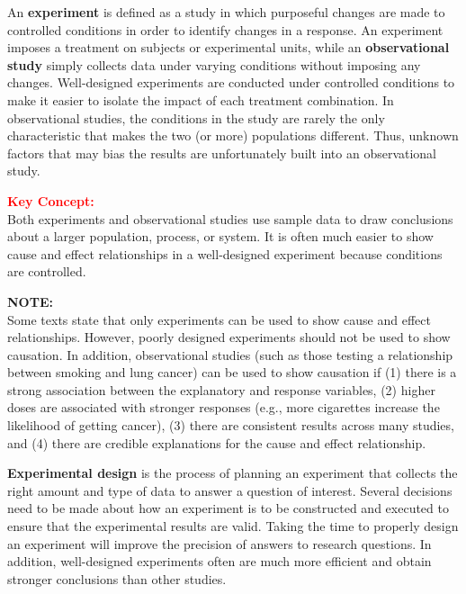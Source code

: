 \documentclass[
]{report}
\begin{document}
An \textbf{experiment} is defined as a study in which purposeful changes are made to controlled conditions in order to identify changes in a response. An experiment imposes a treatment on subjects or experimental units, while an \textbf{observational study} simply collects data under varying conditions without imposing any changes. Well-designed experiments are conducted under controlled conditions to make it easier to isolate the impact of each treatment combination. In observational studies, the conditions in the study are rarely the only characteristic that makes the two (or more) populations different. Thus, unknown factors that may bias the results are unfortunately built into an observational study.

\large

\textbf{\textcolor{red}{Key Concept:}}\\
\color{red}
Both experiments and observational studies use sample data to draw conclusions about a larger population, process, or system. It is often much easier to show cause and effect relationships in a well-designed experiment because conditions are controlled.\\
\color{black}
\normalsize

\large

\textbf{NOTE:}\\
Some texts state that only experiments can be used to show cause and effect relationships. However, poorly designed experiments should not be used to show causation. In addition, observational studies (such as those testing a relationship between smoking and lung cancer) can be used to show causation if (1) there is a strong association between the explanatory and response variables, (2) higher doses are associated with stronger responses (e.g., more cigarettes increase the likelihood of getting cancer), (3) there are consistent results across many studies, and (4) there are credible explanations for the cause and effect relationship.\\
\normalsize

\textbf{Experimental design} is the process of planning an experiment that collects the right amount and type of data to answer a question of interest. Several decisions need to be made about how an experiment is to be constructed and executed to ensure that the experimental results are valid. Taking the time to properly design an experiment will improve the precision of answers to research questions. In addition, well-designed experiments often are much more efficient and obtain stronger conclusions than other studies.
\end{document}
